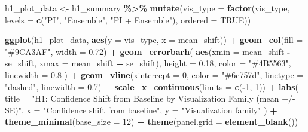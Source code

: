 \documentclass[
]{article}
\newenvironment{Shaded}{\begin{snugshade}}{\end{snugshade}}
\newcommand{\AttributeTok}[1]{\textcolor[rgb]{0.13,0.29,0.53}{#1}}
\newcommand{\ConstantTok}[1]{\textcolor[rgb]{0.56,0.35,0.01}{#1}}
\newcommand{\DecValTok}[1]{\textcolor[rgb]{0.00,0.00,0.81}{#1}}
\newcommand{\FloatTok}[1]{\textcolor[rgb]{0.00,0.00,0.81}{#1}}
\newcommand{\FunctionTok}[1]{\textcolor[rgb]{0.13,0.29,0.53}{\textbf{#1}}}
\newcommand{\NormalTok}[1]{#1}
\newcommand{\OtherTok}[1]{\textcolor[rgb]{0.56,0.35,0.01}{#1}}
\newcommand{\SpecialCharTok}[1]{\textcolor[rgb]{0.81,0.36,0.00}{\textbf{#1}}}
\newcommand{\StringTok}[1]{\textcolor[rgb]{0.31,0.60,0.02}{#1}}
\begin{document}
\begin{Shaded}
\begin{Highlighting}[]
\NormalTok{h1\_plot\_data }\OtherTok{\textless{}{-}}\NormalTok{ h1\_summary }\SpecialCharTok{\%\textgreater{}\%}
  \FunctionTok{mutate}\NormalTok{(}\AttributeTok{vis\_type =} \FunctionTok{factor}\NormalTok{(vis\_type, }\AttributeTok{levels =} \FunctionTok{c}\NormalTok{(}\StringTok{"PI"}\NormalTok{, }\StringTok{"Ensemble"}\NormalTok{, }\StringTok{"PI + Ensemble"}\NormalTok{), }\AttributeTok{ordered =} \ConstantTok{TRUE}\NormalTok{))}

\FunctionTok{ggplot}\NormalTok{(h1\_plot\_data, }\FunctionTok{aes}\NormalTok{(}\AttributeTok{y =}\NormalTok{ vis\_type, }\AttributeTok{x =}\NormalTok{ mean\_shift)) }\SpecialCharTok{+}
  \FunctionTok{geom\_col}\NormalTok{(}\AttributeTok{fill =} \StringTok{"\#9CA3AF"}\NormalTok{, }\AttributeTok{width =} \FloatTok{0.72}\NormalTok{) }\SpecialCharTok{+}
  \FunctionTok{geom\_errorbarh}\NormalTok{(}
    \FunctionTok{aes}\NormalTok{(}\AttributeTok{xmin =}\NormalTok{ mean\_shift }\SpecialCharTok{{-}}\NormalTok{ se\_shift, }\AttributeTok{xmax =}\NormalTok{ mean\_shift }\SpecialCharTok{+}\NormalTok{ se\_shift),}
    \AttributeTok{height =} \FloatTok{0.18}\NormalTok{,}
    \AttributeTok{color =} \StringTok{"\#4B5563"}\NormalTok{,}
    \AttributeTok{linewidth =} \FloatTok{0.8}
\NormalTok{  ) }\SpecialCharTok{+}
  \FunctionTok{geom\_vline}\NormalTok{(}\AttributeTok{xintercept =} \DecValTok{0}\NormalTok{, }\AttributeTok{color =} \StringTok{"\#6c757d"}\NormalTok{, }\AttributeTok{linetype =} \StringTok{"dashed"}\NormalTok{, }\AttributeTok{linewidth =} \FloatTok{0.7}\NormalTok{) }\SpecialCharTok{+}
  \FunctionTok{scale\_x\_continuous}\NormalTok{(}\AttributeTok{limits =} \FunctionTok{c}\NormalTok{(}\SpecialCharTok{{-}}\DecValTok{1}\NormalTok{, }\DecValTok{1}\NormalTok{)) }\SpecialCharTok{+}
  \FunctionTok{labs}\NormalTok{(}
    \AttributeTok{title =} \StringTok{"H1: Confidence Shift from Baseline by Visualization Family (mean +/{-} SE)"}\NormalTok{,}
    \AttributeTok{x =} \StringTok{"Confidence shift from baseline"}\NormalTok{,}
    \AttributeTok{y =} \StringTok{"Visualization family"}
\NormalTok{  ) }\SpecialCharTok{+}
  \FunctionTok{theme\_minimal}\NormalTok{(}\AttributeTok{base\_size =} \DecValTok{12}\NormalTok{) }\SpecialCharTok{+}
  \FunctionTok{theme}\NormalTok{(}\AttributeTok{panel.grid =} \FunctionTok{element\_blank}\NormalTok{())}
\end{Highlighting}
\end{Shaded}
\end{document}
